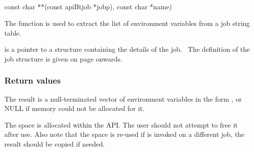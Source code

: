 \subsection{\funcnameXBgetenvlist{}}

\begin{expara}

const char **\funcnameXBgetenvlist{}(const apiBtjob *jobp), const char *name)

\end{expara}

The function \funcXBgetenvlist{} is used to extract
the list of environment variables from a job string table.

 is a pointer to a structure containing the
details of the job. \ The definition of the job structure is given on
page \pageref{bkm:Jobstructure} onwards.

\subsubsection{Return values}
The result is a null-terminated vector of environment variables in the
form , or NULL if memory could not be
allocated for it.

The space is allocated within the API. The user should not attempt to
free it after use. Also note that the space is re-used if
\funcXBgetenv{} is invoked on a different job, the
result should be copied if needed.

